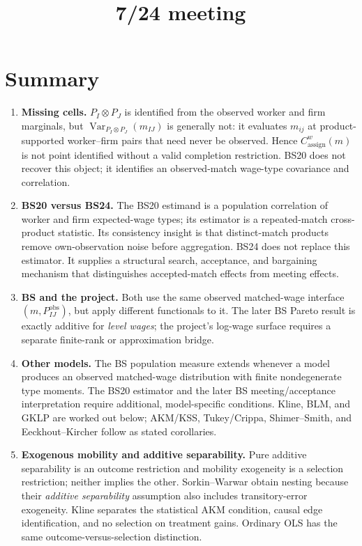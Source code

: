 \documentclass[11pt]{article}
\title{7/24 meeting}
\author{}
\date{}
\begin{document}
\maketitle

\section*{Summary}

\begin{enumerate}
\item \textbf{Missing cells.}
  \(P_I\otimes P_J\) is identified from the observed worker and firm
  marginals, but
  \(\operatorname{Var}_{P_I\otimes P_J}(m_{IJ})\) is generally not:
  it evaluates \(m_{ij}\) at product-supported worker--firm pairs that need
  never be observed.  Hence \(C^w_{\mathrm{assign}}(m)\) is not point
  identified without a valid completion restriction.  BS20 does not recover
  this object; it identifies an observed-match wage-type covariance and
  correlation.
\item \textbf{BS20 versus BS24.}
  The BS20 estimand is a population correlation of worker and firm
  expected-wage types; its estimator is a repeated-match cross-product
  statistic.  Its consistency insight is that distinct-match products remove
  own-observation noise before aggregation.  BS24 does not replace this
  estimator.  It supplies a structural search, acceptance, and bargaining
  mechanism that distinguishes accepted-match effects from meeting effects.
\item \textbf{BS and the project.}
  Both use the same observed matched-wage interface
  \((m,P^{\mathrm{obs}}_{IJ})\), but apply different functionals to it.  The
  later BS Pareto result is exactly additive for \emph{level wages}; the
  project's log-wage surface requires a separate finite-rank or approximation
  bridge.
\item \textbf{Other models.}
  The BS population measure extends whenever a model produces an observed
  matched-wage distribution with finite nondegenerate type moments.  The BS20
  estimator and the later BS meeting/acceptance interpretation require
  additional, model-specific conditions.  Kline, BLM, and GKLP are worked out
  below; AKM/KSS, Tukey/Crippa, Shimer--Smith, and Eeckhout--Kircher follow as
  stated corollaries.
\item \textbf{Exogenous mobility and additive separability.}
  Pure additive separability is an outcome restriction and mobility
  exogeneity is a selection restriction; neither implies the other.
  Sorkin--Warwar obtain nesting because their \emph{additive separability}
  assumption also includes transitory-error exogeneity.  Kline separates the
  statistical AKM condition, causal edge identification, and no selection on
  treatment gains.  Ordinary OLS has the same outcome-versus-selection
  distinction.
\end{enumerate}
\end{document}
